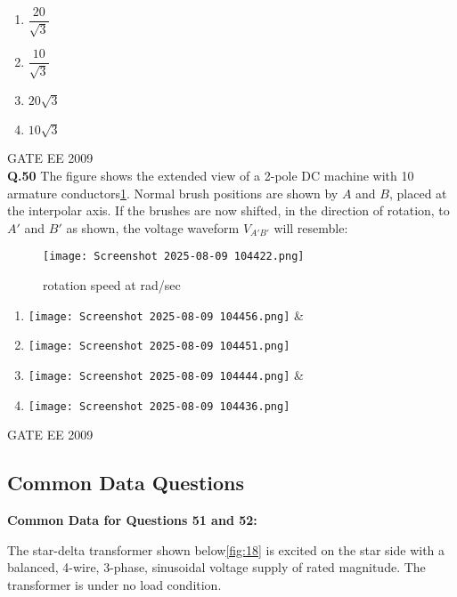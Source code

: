 \documentclass[12pt]{article}
\begin{document}
\noindent
\begin{enumerate}
    

\item \(\dfrac{20}{\sqrt{3}}\) 
\item \(\dfrac{10}{\sqrt{3}}\) 
\item \(20\sqrt{3}\) 
\item  \(10\sqrt{3}\)
\end{enumerate}

\vspace{0.5cm}
\hspace{10pt}
GATE EE 2009\\
\textbf{Q.50} The figure shows the extended view of a 2-pole DC machine with 10 armature conductors\ref{fig:17}.
Normal brush positions are shown by \(A\) and \(B\), placed at the interpolar axis. If the brushes are now 
shifted, in the direction of rotation, to \(A'\) and \(B'\) as shown, the voltage waveform \(V_{A'B'}\) will resemble:
\begin{figure}[h]
    \centering
    \texttt{[image: Screenshot 2025-08-09 104422.png]}
    \label{fig:17}
    \caption{rotation speed at \omega  rad/sec}
\end{figure}


\noindent
\begin{enumerate}
     

\item  \texttt{[image: Screenshot 2025-08-09 104456.png]} &
\item  \texttt{[image: Screenshot 2025-08-09 104451.png]} 
\item  \texttt{[image: Screenshot 2025-08-09 104444.png]} &
\item  \texttt{[image: Screenshot 2025-08-09 104436.png]}
\end{enumerate}

\hspace{10pt}
GATE EE 2009\\
\subsection*{Common Data Questions}

\textbf{Common Data for Questions 51 and 52:}

The star-delta transformer shown below\ref{fig:18} is excited on the star side with a balanced, 4-wire, 3-phase, 
sinusoidal voltage supply of rated magnitude. The transformer is under no load condition.
\end{document}
